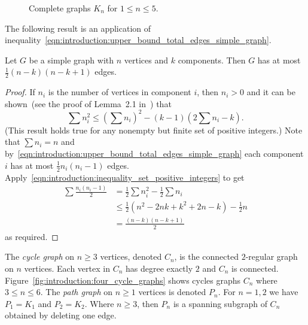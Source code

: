 \begin{figure}[!htbp]
\centering

\caption{Complete graphs $K_n$ for $1 \leq n \leq 5$.}
\label{fig:introduction:five_complete_graphs}
\end{figure}

The following result is an application of
inequality~\eqref{eqn:introduction:upper_bound_total_edges_simple_graph}.

\begin{theorem}
Let $G$ be a simple graph with $n$ vertices and $k$ components. Then
$G$ has at most $\frac{1}{2} (n - k)(n - k + 1)$ edges.
\end{theorem}

\begin{proof}
If $n_i$ is the number of vertices in component $i$, then $n_i > 0$
and it can be shown~(see the proof of Lemma~2.1
in~\cite[pp.21--22]{Foulds1992}) that
\begin{equation}
\label{eqn:introduction:inequality_set_positive_integers}
\sum n_i^2
\leq
\left(\sum n_i\right)^2 - (k - 1) \left(2 \sum n_i - k\right).
\end{equation}
(This result holds true for any nonempty but finite set of positive
integers.) Note that $\sum n_i = n$ and
by~\eqref{eqn:introduction:upper_bound_total_edges_simple_graph} each
component $i$ has at most $\frac{1}{2} n_i (n_i - 1)$
edges. Apply~\eqref{eqn:introduction:inequality_set_positive_integers}
to get
\begin{align*}
\sum \frac{n_i (n_i - 1)}{2}
&=
\frac{1}{2} \sum n_i^2 - \frac{1}{2} \sum n_i \\[4pt]
&\leq
\frac{1}{2} (n^2 - 2nk + k^2 + 2n - k) - \frac{1}{2} n \\[4pt]
&=
\frac{(n - k) (n - k + 1)}{2}
\end{align*}
as required.
\end{proof}

The \emph{cycle graph} on $n \geq 3$ vertices,
denoted $C_n$, is the connected $2$-regular graph on $n$
vertices. Each vertex in $C_n$ has degree exactly $2$ and $C_n$ is
connected. Figure~\ref{fig:introduction:four_cycle_graphs} shows
cycles graphs $C_n$ where $3 \leq n \leq 6$. The
\emph{path graph} on $n \geq 1$ vertices is denoted
$P_n$. For $n = 1, 2$ we have $P_1 = K_1$ and
$P_2 = K_2$. Where $n \geq 3$, then $P_n$ is a spanning subgraph of
$C_n$ obtained by deleting one edge.

